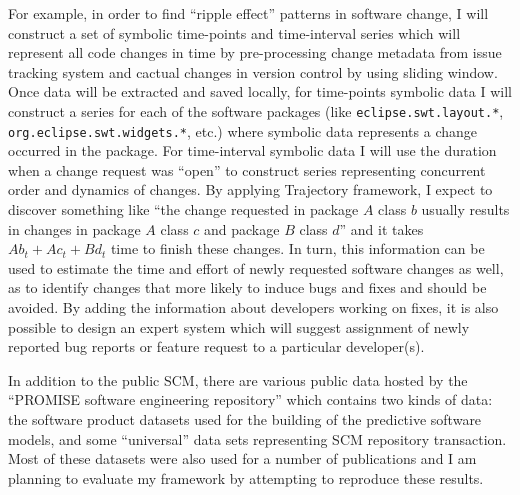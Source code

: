 For example, in order to find ``ripple effect'' patterns in software change, I will construct a set of symbolic time-points and time-interval series which will represent all code changes in time by pre-processing change metadata from issue tracking system and cactual changes in version control by using sliding window. Once data will be extracted and saved locally, for time-points symbolic data I will construct a series for each of the software packages (like \texttt{eclipse.swt.layout.*}, \texttt{org.eclipse.swt.widgets.*}, etc.) where symbolic data represents a change occurred in the package. For time-interval symbolic data I will use the duration when a change request was ``open'' to construct series representing concurrent order and dynamics of changes. By applying Trajectory framework, I expect to discover something like ``the change requested in package $A$ class $b$ usually results in changes in package $A$ class $c$ and package $B$ class $d$'' and it takes $Ab_{t} + Ac_{t} + Bd_{t}$ time to finish these changes. In turn, this information can be used to estimate the time and effort of newly requested software changes as well, as to identify changes that more likely to induce bugs and fixes and should be avoided. By adding the information about developers working on fixes, it is also possible to design an expert system which will suggest assignment of newly reported bug reports or feature request to a particular developer(s).

In addition to the public SCM, there are various public data hosted by the ``PROMISE software engineering repository'' \cite{Sayyad:2005} which contains two kinds of data: the software product datasets used for the building of the predictive software models, and some ``universal'' data sets representing SCM repository transaction. Most of these datasets were also used for a number of publications and I am planning to evaluate my framework by attempting to reproduce these results. 
